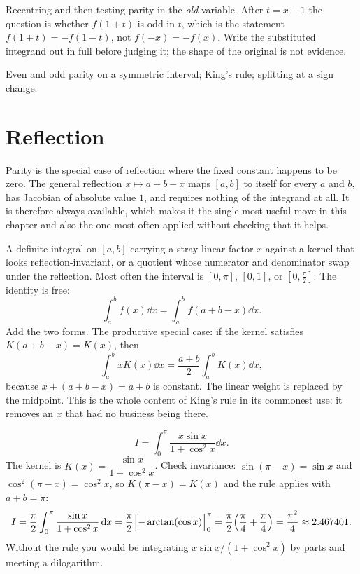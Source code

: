 \begin{trap}
Recentring and then testing parity in the \emph{old} variable. After $t=x-1$ the question is whether $f(1+t)$ is odd in $t$, which is the statement $f(1+t)=-f(1-t)$, not $f(-x)=-f(x)$. Write the substituted integrand out in full before judging it; the shape of the original is not evidence.
\end{trap}

\begin{seealsob}Even and odd parity on a symmetric interval; King's rule; splitting at a sign change.\end{seealsob}

\section{Reflection}

Parity is the special case of reflection where the fixed constant happens to be zero. The general reflection $x\mapsto a+b-x$ maps $[a,b]$ to itself for every $a$ and $b$, has Jacobian of absolute value $1$, and requires nothing of the integrand at all. It is therefore always available, which makes it the single most useful move in this chapter and also the one most often applied without checking that it helps.

\cue A definite integral on $[a,b]$ carrying a stray linear factor $x$ against a kernel that looks reflection-invariant, or a quotient whose numerator and denominator swap under the reflection. Most often the interval is $[0,\pi]$, $[0,1]$, or $[0,\tfrac{\pi}{2}]$.
\method The identity is free:
\[\int_a^bf(x)\dd x=\int_a^bf(a+b-x)\dd x.\]
Add the two forms. The productive special case: if the kernel satisfies $K(a+b-x)=K(x)$, then
\[\int_a^bxK(x)\dd x=\frac{a+b}{2}\int_a^bK(x)\dd x,\]
because $x+(a+b-x)=a+b$ is constant. The linear weight is replaced by the midpoint. This is the whole content of King's rule in its commonest use: it removes an $x$ that had no business being there.

\begin{worked}
\[I=\int_0^{\pi}\frac{x\sin x}{1+\cos^{2}x}\dd x.\]
The kernel is $K(x)=\dfrac{\sin x}{1+\cos^{2}x}$. Check invariance: $\sin(\pi-x)=\sin x$ and $\cos^{2}(\pi-x)=\cos^{2}x$, so $K(\pi-x)=K(x)$ and the rule applies with $a+b=\pi$:
\[I=\frac{\pi}{2}\int_0^{\pi}\frac{\sin x}{1+\cos^{2}x}\,\mathrm{d} x=\frac{\pi}{2}\Bigl[-\arctan(\cos x)\Bigr]_0^{\pi}=\frac{\pi}{2}\Bigl(\frac{\pi}{4}+\frac{\pi}{4}\Bigr)=\frac{\pi^{2}}{4}\approx2.467401.\]
Without the rule you would be integrating $x\sin x/(1+\cos^{2}x)$ by parts and meeting a dilogarithm.
\end{worked}

